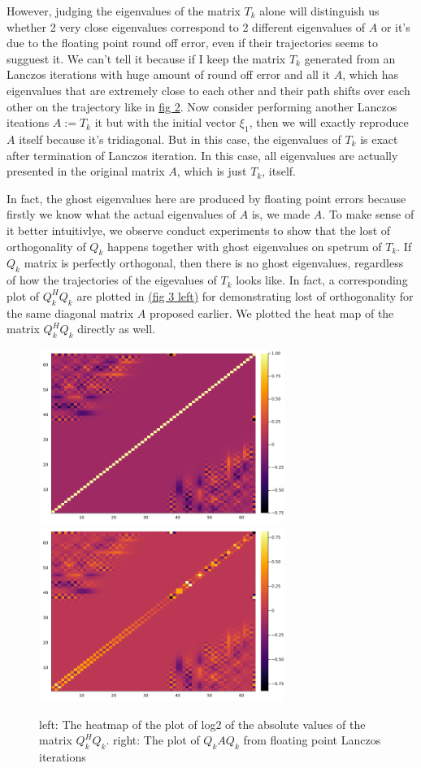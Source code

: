 \documentclass[]{article}
\theoremstyle{definition}
\begin{document}
            \par
            However, judging the eigenvalues of the matrix $T_k$ alone will distinguish us whether 2 very close eigenvalues correspond to 2 different eigenvalues of $A$ or it's due to the floating point round off error, even if their trajectories seems to sugguest it. We can't tell it because if I keep the matrix $T_k$ generated from an Lanczos iterations with huge amount of round off error and all it $A$, which has eigenvalues that are extremely close to each other and their path shifts over each other on the trajectory like in \hyperref[fig:2]{fig 2}. Now consider performing another Lanczos iteations $A:=T_k$ it but with the initial vector $\xi_1$, then we will exactly reproduce $A$ itself because it's tridiagonal. But in this case, the eigenvalues of $T_k$ is exact after termination of Lanczos iteration. In this case, all eigenvalues are actually presented in the original matrix $A$, which is just $T_k$, itself. 
            \par
            In fact, the ghost eigenvalues here are produced by floating point errors because firstly we know what the actual eigenvalues of $A$ is, we made $A$. To make sense of it better intuitivlye, we observe conduct experiments to show that the lost of orthogonality of $Q_k$ happens together with ghost eigenvalues on spetrum of $T_k$. If $Q_k$ matrix is perfectly orthogonal, then there is no ghost eigenvalues, regardless of how the trajectories of the eigevalues of $T_k$ looks like. In fact, a corresponding plot of $Q_k^HQ_k$ are plotted in \hyperref[fig:3]{(fig 3 left)} for demonstrating lost of orthogonality for the same diagonal matrix $A$ proposed earlier. We plotted the heat map of the matrix $Q^H_kQ_k$ directly as well.
            \begin{figure}[H]\label{fig:3}
                \centering
                \includegraphics[width=8cm]{fig3.png}
                \includegraphics[width=8cm]{fig4.png}
                \caption{left: The heatmap of the plot of log2 of the absolute values of the matrix $Q^H_kQ_k$. right: The plot of $Q_kAQ_k$ from floating point Lanczos iterations}
            \end{figure}
\end{document}
